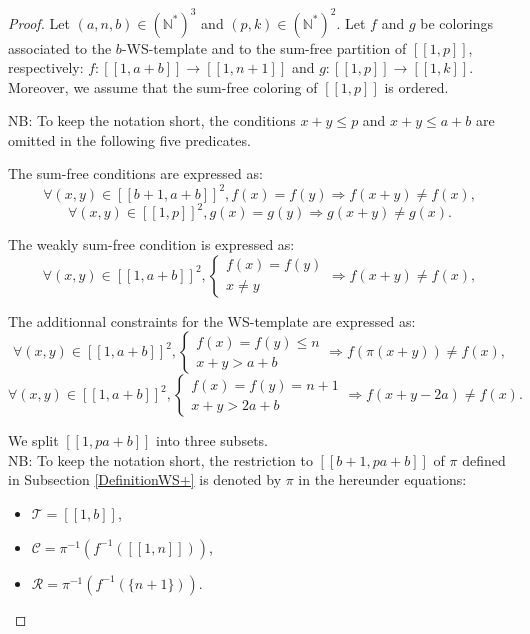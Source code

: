 \documentclass[final,onefignum,onetabnum]{siamart190516}
\begin{document}
\begin{proof}
\begin{sloppypar}
Let \((a,n,b) \in (\mathbb{N}^*)^3\) and \((p,k) \in (\mathbb{N}^*)^2\). Let \(f\) and \(g\) be colorings associated 
to the \(b\)-WS-template and to the sum-free partition of \([\![1,p]\!]\), respectively: 
\({f : [\![1, a + b]\!] \longrightarrow [\![1,n+1]\!]}\) and \({g : [\![1, p]\!]  \longrightarrow [\![1, k]\!]}\). Moreover, 
we assume that the sum-free coloring of \([\![1, p]\!]\) is ordered.
\end{sloppypar}

\par
NB: To keep the notation short, the conditions \(x + y \leqslant p\)  and \(x + y \leqslant a + b\) are omitted in the following five predicates.

The sum-free conditions are expressed as:
\[
\forall (x,y) \in [\![b+1,a + b]\!]^2, f(x) = f(y) \Longrightarrow f(x+y) \neq f(x),
\]
\[
\forall (x,y) \in [\![1,p]\!]^2, g(x) = g(y) \Longrightarrow g(x+y) \neq g(x).
\]

The weakly sum-free condition is expressed as:
\[
\forall (x,y) \in [\![1,a + b]\!]^2, \left\{
\begin{array}{l}
	f(x) = f(y) \\
	x \neq y
\end{array}
\right. \Longrightarrow f(x+y) \neq f(x),
\]

The additionnal constraints for the WS-template are expressed as:
\[
\forall (x,y) \in [\![1,a + b]\!]^2, \left\{
\begin{array}{l}
	f(x) = f(y) \leqslant n \\
	x + y > a + b
\end{array}
\right. \Longrightarrow f(\pi(x+y)) \neq f(x),
\]
\[
\forall (x,y) \in [\![1,a + b]\!]^2, \left\{
\begin{array}{l}
	f(x) = f(y) = n + 1 \\
	x + y > 2 a + b
\end{array}
\right. \Longrightarrow f(x+y - 2 a) \neq f(x).
\]

We split \([\![1, p a + b]\!]\) into three subsets. \\
NB: To keep the notation short, the restriction to \([\![b + 1, p a + b]\!]\) of \(\pi\) defined in Subsection \ref{DefinitionWS+}
is denoted by \(\pi\) in the hereunder equations:

\begin{itemize}
	\item \(\mathcal{T} = [\![1, b]\!]\),
	\item \(\mathcal{C} = \pi^{-1}(f^{-1}([\![1, n]\!]))\),
	\item \(\mathcal{R} = \pi^{-1}(f^{-1}(\{n + 1\}))\).
\end{itemize}


\end{proof}
\end{document}
